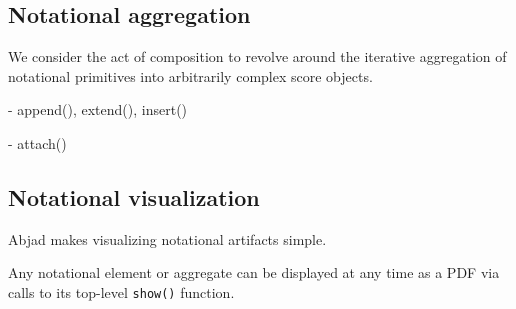 \subsection{Notational aggregation}

We consider the act of composition to revolve around the iterative aggregation
of notational primitives into arbitrarily complex score objects.

- append(), extend(), insert()

- attach()

\subsection{Notational visualization}

Abjad makes visualizing notational artifacts simple.

Any notational element or aggregate can be displayed at any time as a PDF via
calls to its top-level \texttt{show()} function.